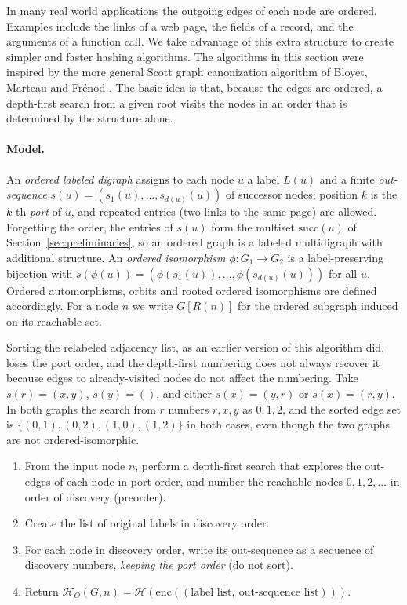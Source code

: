 \documentclass[twoside,leqno]{article}
\newcommand{\HO}{\mathcal{H}_{O}}
\newcommand{\Succ}{\mathrm{succ}}
\newcommand{\enc}{\mathrm{enc}}
\newcommand{\Reach}{R}
\begin{document}
In many real world applications the outgoing edges of each node are ordered. Examples include the links of a web page, the fields of a record, and the arguments of a function call. We take advantage of this extra structure to create simpler and faster hashing algorithms. The algorithms in this section were inspired by the more general Scott graph canonization algorithm of Bloyet, Marteau and Fr\'enod \cite{scott}. The basic idea is that, because the edges are ordered, a depth-first search from a given root visits the nodes in an order that is determined by the structure alone.

\paragraph{Model.} An \emph{ordered labeled digraph} assigns to each node $u$ a label $L(u)$ and a finite \emph{out-sequence} $s(u)=(s_1(u),\dots,s_{d(u)}(u))$ of successor nodes; position $k$ is the $k$-th \emph{port} of $u$, and repeated entries (two links to the same page) are allowed. Forgetting the order, the entries of $s(u)$ form the multiset $\Succ(u)$ of Section~\ref{sec:preliminaries}, so an ordered graph is a labeled multidigraph with additional structure. An \emph{ordered isomorphism} $\phi:G_1\to G_2$ is a label-preserving bijection with $s(\phi(u)) = (\phi(s_1(u)),\dots,\phi(s_{d(u)}(u)))$ for all $u$. Ordered automorphisms, orbits and rooted ordered isomorphisms are defined accordingly. For a node $n$ we write $G[\Reach(n)]$ for the ordered subgraph induced on its reachable set.

\begin{exmp}
\label{ex:ordered}
Sorting the relabeled adjacency list, as an earlier version of this algorithm did, loses the port order, and the depth-first numbering does not always recover it because edges to already-visited nodes do not affect the numbering. Take $s(r)=(x,y)$, $s(y)=()$, and either $s(x)=(y,r)$ or $s(x)=(r,y)$. In both graphs the search from $r$ numbers $r,x,y$ as $0,1,2$, and the sorted edge set is $\{(0,1),(0,2),(1,0),(1,2)\}$ in both cases, even though the two graphs are not ordered-isomorphic.
\end{exmp}

\begin{algorithm}[H]
    \caption{Node Hash --- Outgoing Ordered Edges}
    \label{alg:node-outgoing-edges}
    \begin{enumerate}
        \item From the input node $n$, perform a depth-first search that explores the out-edges of each node in port order, and number the reachable nodes $0,1,2,\dots$ in order of discovery (preorder).
        \item Create the list of original labels in discovery order.
        \item For each node in discovery order, write its out-sequence as a sequence of discovery numbers, \emph{keeping the port order} (do not sort).
        \item Return $\HO(G,n)=\mathcal{H}(\enc((\text{label list},\ \text{out-sequence list})))$.
    \end{enumerate}
\end{algorithm}
\end{document}
